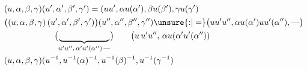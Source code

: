 \[
\begin{aligned}
 &(u,\alpha,\beta,\gamma)(u',\alpha',\beta',\gamma')=(uu',\alpha u(\alpha'),\beta u(\beta'),\gamma u(\gamma')\\
 &\bigl((u,\alpha,\beta,\gamma)\,(u',\alpha',\beta',\gamma')\bigr)(u'',\alpha'',\beta'',\gamma'')
 \unsure{\mathbin{:}|=}\bigl(uu'u'',\alpha u(\alpha')uu'(\alpha''),\text{---}\bigr)\\
 &\hspace{6em}\bigl(\underbrace{\hspace{6em}}_{u'u'',\,\alpha'u'(\alpha'')\,\text{---}}\bigr)
 \qquad\bigl(u\,u'u'',\,\alpha u(\alpha'u'(\alpha''))\\
 &(u,\alpha,\beta,\gamma)(u^{-1},u^{-1}(\alpha)^{-1},u^{-1}(\beta)^{-1},u^{-1}(\gamma^{-1})
\end{aligned}
\]
